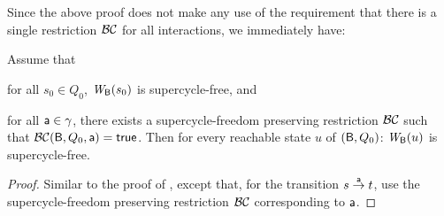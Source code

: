 Since the above proof does not make any use of the requirement that there is a single restriction
$\mathcal{BC}$ for all interactions, we immediately have:


\begin{corollary}

\label{cor:SC-free-preserving.deadlock-free}
Assume that
\bn
\item \label{cor:SC-free-preserving.initial}
      for all $s_0 \in Q_0$, $\mathit{W}_{\mathsf{B}}({s_0})$ is supercycle-free, and
\item \label{cor:SC-free-preserving.reachable-transitions}
   for all $\mathsf{a} \in \gamma$, there exists a supercycle-freedom preserving restriction $\mathcal{BC}$ such that $\mathcal{BC}(\mathsf{B}, Q_0, \mathsf{a}) = \mathsf{true}$.
\en
Then for every reachable state $u$ of $(\mathsf{B}, Q_0)$:  $\mathit{W}_{\mathsf{B}}({u})$ is supercycle-free.
\end{corollary}
%
\begin{proof}
Similar to the proof of ,  except that, for
the transition $s \stackrel{\mathsf{a}}{\rightarrow} t$, use the  supercycle-freedom preserving restriction $\mathcal{BC}$
corresponding to $\mathsf{a}$.
\end{proof}
















